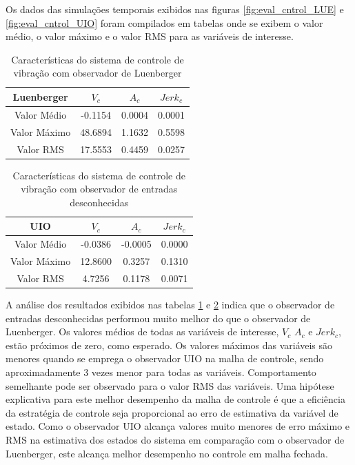 Os dados das simulações temporais exibidos nas figuras \ref{fig:eval_cntrol_LUE} e \ref{fig:eval_cntrol_UIO} foram compilados em tabelas onde se exibem o valor médio, o valor máximo e o valor RMS para as variáveis de interesse.
\FloatBarrier
\begin{table}[h!]
\footnotesize
\centering
    \begin{tabular}{|c|c|c|c|}
        \hline
        Luenberger& $V_c$& $A_c$& $Jerk_c$\\
        \hline
        \hline
         Valor Médio&   -0.1154&    0.0004&    0.0001\\ 
         Valor Máximo&  48.6894&    1.1632&    0.5598\\ 
         Valor RMS&     17.5553&    0.4459&    0.0257\\
        \hline
    \end{tabular} \label{tb:comparacao_controle_LUE}\caption{Características do sistema de controle de vibração com observador de Luenberger}
\end{table}

\begin{table}[h!]
\footnotesize
\centering
    \begin{tabular}{|c|c|c|c|}
        \hline
        UIO& $V_c$& $A_c$& $Jerk_c$\\
        \hline
        \hline
         Valor Médio&   -0.0386&   -0.0005&    0.0000\\ 
         Valor Máximo&  12.8600&    0.3257&    0.1310\\ 
         Valor RMS&      4.7256&    0.1178&    0.0071\\
        \hline
    \end{tabular} \label{tb:comparacao_controle_UIO}\caption{Características do sistema de controle de vibração com observador de entradas desconhecidas}
\end{table}
\FloatBarrier

A análise dos resultados exibidos nas tabelas \ref{tb:comparacao_controle_LUE} e \ref{tb:comparacao_controle_UIO} indica que o observador de entradas desconhecidas performou muito melhor do que o observador de Luenberger. Os valores médios de todas as variáveis de interesse, $V_c$ $A_c$ e $Jerk_c$, estão próximos de zero, como esperado. Os valores máximos das variáveis são menores quando se emprega o observador UIO na malha de controle, sendo aproximadamente 3 vezes menor para todas as variáveis. Comportamento semelhante pode ser observado para o valor RMS das variáveis. 
Uma hipótese explicativa para este melhor desempenho da malha de controle é que a eficiência da estratégia de controle seja proporcional ao erro de estimativa da variável de estado. Como o observador UIO alcança valores muito menores de erro máximo e RMS na estimativa dos estados do sistema em comparação com o observador de Luenberger, este alcança melhor desempenho no controle em malha fechada.
